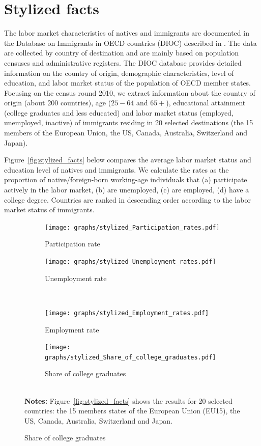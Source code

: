 \documentclass[a4paper,12pt]{article}
\begin{document}
\section{Stylized facts} \label{stylized_facts}

The labor market characteristics of natives and immigrants are documented in the Database on Immigrants in OECD countries (DIOC) described in \citet{Arslan2014}. The data are collected by country of destination and are mainly based on population censuses and administrative registers. The DIOC database provides detailed information on the country of origin, demographic characteristics, level of education, and labor market status of the population of OECD member states. Focusing on the census round 2010, we extract information about the country of origin (about 200 countries), age ($25-64$ and $65+$), educational attainment (college graduates and less educated) and labor market status (employed, unemployed, inactive) of immigrants residing in 20 selected destinations (the 15 members of the European Union, the US, Canada, Australia, Switzerland and Japan).

Figure~\ref{fig:stylized_facts} below compares the average labor market status and education level of natives and immigrants. We calculate the rates as the proportion of native/foreign-born working-age individuals that (a) participate actively in the labor market, (b) are unemployed, (c) are employed, (d) have a college degree. Countries are ranked in descending order according to the labor market status of immigrants. 

\begin{figure}[htb!]
\centering
\caption{Labor market status of immigrants and natives in 20 OECD
countries}
\renewcommand{\arraystretch}{0.55}
\label{fig:stylized_facts}
\begin{subfigure}{.45\linewidth}
  \centering
      \caption{Participation rate}
      \label{fig:stylized_facts_a}
  \texttt{[image: graphs/stylized\_Participation\_rates.pdf]}
\end{subfigure}%
\begin{subfigure}{.45\linewidth}
  \centering
  \caption{Unemployment rate}
        \label{fig:stylized_facts_b}
  \texttt{[image: graphs/stylized\_Unemployment\_rates.pdf]}
\end{subfigure}
\\[0.5cm]
\begin{subfigure}{.45\linewidth}
  \centering
      \caption{Employment rate}
     \label{fig:stylized_facts_c}
  \texttt{[image: graphs/stylized\_Employment\_rates.pdf]}
\end{subfigure}%
\begin{subfigure}{.45\linewidth}
  \centering
 \caption{Share of college graduates}
      \label{fig:stylized_facts_d}
  \texttt{[image: graphs/stylized\_Share\_of\_college\_graduates.pdf]}
\end{subfigure}
\\[0.5cm]
{\footnotesize \textbf{Notes:} Figure~\ref{fig:stylized_facts} shows the results for 20 selected countries: the 15 members states of the European Union (EU15), the US, Canada, Australia, Switzerland and Japan.}
\end{figure}
\end{document}
